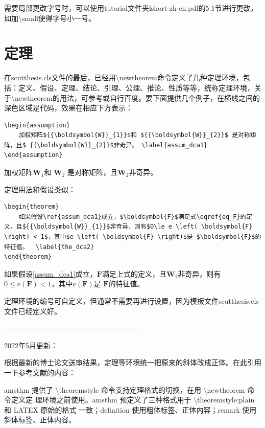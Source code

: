 需要局部更改字号时，可以使用tutorial文件夹lshort-zh-cn.pdf的5.1节进行更改，如加\textbackslash{}small使得字号小一号。
\section{定理}
在scutthesis.cls文件的最后，已经用\textbackslash{}newtheorem命令定义了几种定理环境，包括：定义、假设、定理、结论、引理、公理、推论、性质等等，统称定理环境，关于\textbackslash{}newtheorem的用法，可参考\cite{_g,_c}或自行百度。要下面提供几个例子，在横线之间的深色区域是代码，效果在相应下方表示：
\begin{lstlisting}
\begin{assumption}
	加权矩阵${{\boldsymbol{W}}_{1}}$和 ${{\boldsymbol{W}}_{2}}$ 是对称矩阵，且$ {{\boldsymbol{W}}_{2}}$非奇异。	\label{assum_dca1}
\end{assumption}
\end{lstlisting}
\begin{assumption}
	加权矩阵${{\boldsymbol{W}}_{1}}$和 ${{\boldsymbol{W}}_{2}}$ 是对称矩阵，且$ {{\boldsymbol{W}}_{2}}$非奇异。	\label{assum_dca1}
\end{assumption}

定理用法和假设类似：
\begin{lstlisting}
\begin{theorem}
	如果假设\ref{assum_dca1}成立，$\boldsymbol{F}$满足式\eqref{eq_F}的定义，且${{\boldsymbol{W}}_{1}}$非奇异，则有$0\le e \left( \boldsymbol{F} \right) < 1$，其中$e \left( \boldsymbol{F} \right)$是 $\boldsymbol{F}$的特征值。	\label{the_dca2}
\end{theorem}
\end{lstlisting}
\begin{theorem}
	如果假设\ref{assum_dca1}成立，$\boldsymbol{F}$满足上式的定义，且${{\boldsymbol{W}}_{1}}$非奇异，则有$0\le e \left( \boldsymbol{F} \right) < 1$，其中$e \left( \boldsymbol{F} \right)$是 $\boldsymbol{F}$的特征值。	\label{the_dca2}
\end{theorem}
\begin{remark}
	定理环境的编号可自定义，但通常不需要再进行设置，因为模板文件scutthesis.cls文件已经定义好。
\end{remark}

---------------------------------------------------------

2022年5月更新：

根据最新的博士论文送审结果，定理等环境统一把原来的斜体改成正体。在此引用一下参考文献\cite{_g}的内容：

amsthm 提供了 \textbackslash{}theoremstyle 命令支持定理格式的切换，在用 \textbackslash{}newtheorem 命令定义定 理环境之前使用。amsthm 预定义了三种格式用于 \textbackslash{}theoremstyle:plain 和 LATEX 原始的格式 一致；definition 使用粗体标签、正体内容；remark 使用斜体标签、正体内容。

